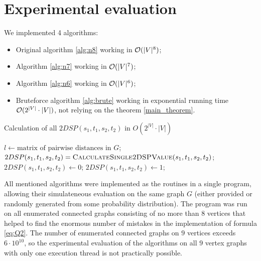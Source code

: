 \section{Experimental evaluation}

We implemented 4 algorithms:

\begin{itemize}
\item Original algorithm \ref{alg:n8} working in $\mathcal{O}(|V|^8)$;
\item Algorithm \ref{alg:n7} working in $\mathcal{O}(|V|^7)$;
\item Algorithm \ref{alg:n6} working in $\mathcal{O}(|V|^6)$;
\item Bruteforce algorithm \ref{alg:brute} working in exponential running time $\mathcal{O}(2^{|V|} \cdot |V|)$, not relying on the theorem \ref{main_theorem}.
\end{itemize}

\begin{algorithm}
\caption{Calculation of all $2DSP(s_1, t_1, s_2, t_2)$ in $O(2^{|V|} \cdot |V|)$} \label{alg:brute}
\begin{algorithmic}[1]
\State $l \gets \text{matrix of pairwise distances in }G$;
    \State $2DSP(s_1, t_1, s_2, t_2) = \textsc{CalculateSingle2DSPValue}(s_1, t_1, s_2, t_2)$;
\EndFor
\EndProcedure
\Statex
{}
\State $2DSP(s_1, t_1, s_2, t_2) \gets 0$;
        \State $2DSP(s_1, t_1, s_2, t_2) \gets 1$;
    \EndIf
\EndFor
\EndProcedure
\end{algorithmic}
\end{algorithm}

All mentioned algorithms were implemented as the routines in a single program, allowing their simulateneous evaluation on the same graph $G$ (either provided or randomly generated from some probability distribution). The program was run on all enumerated connected graphs consisting of no more than $8$ vertices that helped to find the enormous number of mistakes in the implementation of formula \eqref{eq:Q2}. The number of enumerated connected graphs on $9$ vertices exceeds $6 \cdot 10^{10}$, so the experimental evaluation of the algorithms on all $9$ vertex graphs with only one execution thread is not practically possible. 

